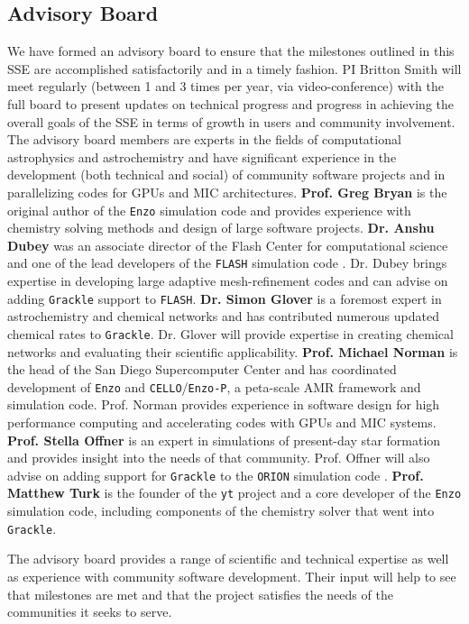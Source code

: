 \documentclass[11pt]{article}
\newcommand{\grackle}{\texttt{Grackle}}
\newcommand{\yt}{\texttt{yt}}
\begin{document}
\begin{flushleft}
\subsection{Advisory Board}

We have formed an advisory board to ensure that the milestones
outlined in this SSE are accomplished satisfactorily and in a timely
fashion.  PI Britton Smith will meet regularly (between 1 and 3 times
per year, via video-conference) with the full board to present updates
on technical progress and progress in achieving the overall goals of
the SSE in terms of growth in users and community involvement.  The
advisory board members are experts in the fields of computational
astrophysics and astrochemistry and have significant experience in the
development (both technical and social) of community software projects
and in parallelizing codes for GPUs and MIC architectures.
{\bf Prof. Greg Bryan} is the original author of the \texttt{Enzo}
simulation code and provides experience with chemistry solving methods
and design of large software projects.
{\bf Dr. Anshu Dubey} was an associate director of the Flash Center
for computational science and one of the lead developers of the
\texttt{FLASH} simulation code \citep{2000ApJS..131..273F,
  2009arXiv0903.4875D}.  Dr. Dubey brings expertise in developing
large adaptive mesh-refinement codes and can advise on adding
\grackle{} support to \texttt{FLASH}.
{\bf Dr. Simon Glover} is a foremost expert in astrochemistry and
chemical networks and has contributed numerous updated chemical rates to
\grackle{}.  Dr. Glover will provide expertise in creating chemical
networks and evaluating their scientific applicability.
{\bf Prof. Michael Norman} is the head of the San Diego Supercomputer
Center and has coordinated development of \texttt{Enzo} and
\texttt{CELLO}/\texttt{Enzo-P}, a peta-scale AMR framework and
simulation code.  Prof. Norman provides experience in software design for
high performance computing and accelerating codes with GPUs and MIC
systems.
{\bf Prof. Stella Offner} is an expert in simulations of present-day
star formation and provides insight into the needs of that community.
Prof. Offner will also advise on adding support for \grackle{} to the
\texttt{ORION} simulation code \citep{2012ApJ...745..139L}.
{\bf Prof. Matthew Turk} is the founder of the \yt{} project and
a core developer of the \texttt{Enzo} simulation code, including
components of the chemistry solver that went into \grackle{}.

The advisory board provides a range of scientific and technical
expertise as well as experience with community software development.
Their input will help to see that milestones are met and that
the project satisfies the needs of the communities it seeks to serve.


\end{flushleft}
\end{document}
